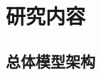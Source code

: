 \documentclass[CJK,aspectratio=169]{beamer}  %
\begin{document}
%		
%			
%			
%			
%		
%		
	
	\section{研究内容}
	
	\subsection{总体模型架构}
	
\end{document}
